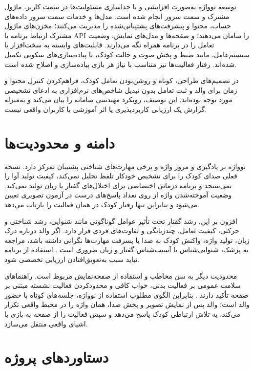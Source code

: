 توسعه نوواژه به‌صورت افزایشی و با جداسازی مسئولیت‌ها در سمت کاربر، ماژول مشترک و سمت سرور انجام شده است. مدل‌ها و خدمات سمت سرور داده‌های حساب، محتوا و پیشرفت‌های پشتیبانی‌شده را مدیریت می‌کنند؛ مخزن‌های ماژول مشترک ارتباط برنامه با API را سامان می‌دهند؛ و صفحه‌ها و مدل‌های نمایش، وضعیت تعامل را در برنامه همراه نگه می‌دارند. قابلیت‌های وابسته به سخت‌افزار یا سیستم‌عامل، مانند ضبط و پخش صوت و حالت کودک، با پیاده‌سازی‌های سکویی تکمیل شده‌اند. رفتار فعالیت‌ها نیز متناسب با نیاز هر بازی پیاده‌سازی و اصلاح شده است.

در تصمیم‌های طراحی، کوتاه و روشن‌بودن تعامل کودک، فراهم‌کردن کنترل محتوا و زمان برای والد و ثبت تعامل بدون تبدیل شاخص‌های نرم‌افزاری به ادعای تشخیصی مورد توجه بوده‌اند. این توصیف، رویکرد مهندسی سامانه را بیان می‌کند و به‌منزله گزارش یک ارزیابی کاربردپذیری یا اثر آموزشی با کاربران واقعی نیست.

\section{دامنه و محدودیت‌ها}

نوواژه بر یادگیری و مرور واژه و برخی مهارت‌های شناختی پشتیبان تمرکز دارد. نسخه فعلی صدای کودک را برای تشخیص خودکار تلفظ تحلیل نمی‌کند، کیفیت تولید آوا را نمی‌سنجد و برنامه درمانی اختصاصی برای اختلال‌های گفتار یا زبان تولید نمی‌کند. وضعیت آموخته‌شدن واژه از روی تعداد پاسخ‌های درست در آزمون تصویری تعیین می‌شود و بنابراین تنها رفتار کودک در همان فعالیت را بازتاب می‌دهد.

افزون بر این، رشد گفتار تحت تأثیر عوامل گوناگونی مانند شنوایی، رشد شناختی و حرکتی، کیفیت تعامل، چندزبانگی و تفاوت‌های فردی قرار دارد. اگر والد درباره درک زبان، تولید واژه، واکنش کودک به صدا یا پسرفت مهارت‌ها نگرانی داشته باشد، مراجعه به پزشک، شنوایی‌شناس یا آسیب‌شناس گفتار و زبان ضروری است \cite{ASHALateLanguage,NIDCDMilestones2022}. استفاده از برنامه نباید سبب به‌تعویق‌افتادن ارزیابی تخصصی شود.

محدودیت دیگر به سن مخاطب و استفاده از صفحه‌نمایش مربوط است. راهنماهای سلامت عمومی بر فعالیت بدنی، خواب کافی و محدودکردن فعالیت نشسته مبتنی بر صفحه تأکید دارند \cite{WHO2019ScreenTime}. بنابراین الگوی مطلوب استفاده از نوواژه، جلسه‌های کوتاه با حضور والد است؛ والد پس از نمایش تصویر و پخش صدا، همان واژه را در محیط واقعی تکرار می‌کند، به تلاش ارتباطی کودک پاسخ می‌دهد و سپس فعالیت را از صفحه به بازی با اشیای واقعی منتقل می‌سازد.

\section{دستاوردهای پروژه}

